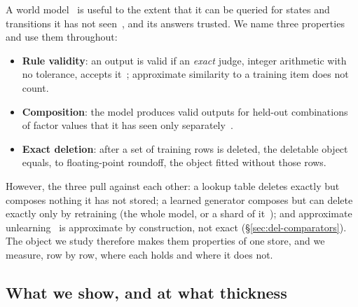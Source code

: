 \documentclass{article} %
\begin{document}
A world model~\citep{ha2018world,hafner2025mastering} is useful to the extent that it can be queried for states and transitions it has
not seen~\citep{valevski2025diffusion}, and its answers trusted. We name three properties and use them throughout:
\begin{itemize}[leftmargin=*,nosep]
\item \textbf{Rule validity}: an output is valid if an \emph{exact} judge, integer arithmetic
  with no tolerance, accepts it~\citep{vafa2024evaluating}; approximate similarity to a training item does not count.
\item \textbf{Composition}: the model produces valid outputs for held-out combinations of
  factor values that it has seen only separately~\citep{zhao2022toward}.
\item \textbf{Exact deletion}: after a set of training rows is deleted, the deletable object
  equals, to floating-point roundoff, the object fitted without those rows.
\end{itemize}
However, the three pull against each other: a lookup table deletes exactly but
composes nothing it has not stored; a learned generator composes but can delete exactly only by
retraining (the whole model, or a shard of it~\citep{bourtoule2021machine}); and approximate unlearning~\citep{guo2020certified,golatkar2020eternal} is approximate by construction, not exact (\S\ref{sec:del-comparators}). The object we study therefore makes them properties of one store, and we measure, row by row, where each holds and where it does not.

\subsection{What we show, and at what thickness}
\label{sec:contrib}
\end{document}

